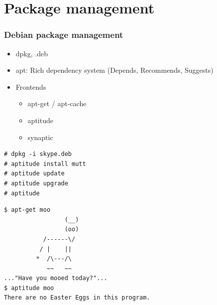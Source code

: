 \documentclass[14pt]{beamer}
\begin{document}
\section{Package management}

\begin{frame}
  \frametitle{Debian package management}
  \begin{itemize}
    \item dpkg, .deb
    \item apt: Rich dependency system (Depends, Recommends, Suggests)
    \item Frontends
      \begin{itemize}
        \item apt-get / apt-cache
        \item aptitude
        \item synaptic
      \end{itemize}
  \end{itemize}
\end{frame}

\begin{frame}[fragile]
\begin{verbatim}
# dpkg -i skype.deb
# aptitude install mutt
# aptitude update
# aptitude upgrade
# aptitude
\end{verbatim}
\end{frame}

\begin{frame}[fragile]
\begin{verbatim}
$ apt-get moo
                 (__) 
                 (oo) 
           /------\/ 
          / |    ||   
         *  /\---/\ 
            ~~   ~~   
..."Have you mooed today?"...
$ aptitude moo
There are no Easter Eggs in this program.
\end{verbatim}
\end{frame}
\end{document}
